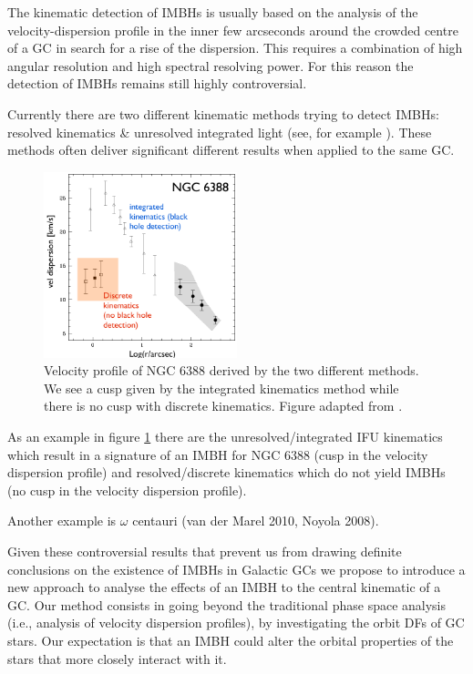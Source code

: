 \par The kinematic detection of \acp{IMBH} is usually based on the analysis of the velocity-dispersion profile in the inner few arcseconds around the crowded centre of a \ac{GC} in search for a rise of the dispersion. This requires a combination of high angular resolution and high spectral resolving power. For this reason the detection of \acp{IMBH} remains still highly controversial. 
\par Currently there are two different kinematic methods trying to detect \acp{IMBH}: resolved kinematics \& unresolved integrated light (see, for example \citealt{2015MNRAS.453..365B}). These methods often deliver significant different results when applied to the same \ac{GC}.
\begin{figure}[htbp]
\centering
\includegraphics[width=0.5\textwidth]{Plots/Paolo_talk_plot.png}
\caption{Velocity profile of NGC 6388 derived by the two different methods. We see a cusp given by the integrated kinematics method while there is no cusp with discrete kinematics. Figure adapted from \citet{2013ApJ...769..107L} .}
\label{fig:NGC6388}
\end{figure}
 As an example in figure \ref{fig:NGC6388} there are the unresolved/integrated IFU kinematics which result in a signature of an \ac{IMBH} for NGC 6388 (cusp in the velocity dispersion profile) \citep{2011A&A...533A..36L} and resolved/discrete kinematics which do not yield \acp{IMBH} (no cusp in the velocity dispersion profile)\citet{2013ApJ...769..107L}. 

Another example is \(\omega\) centauri (van der Marel 2010, Noyola 2008).

\par Given these controversial results that prevent us from drawing definite conclusions on the existence of \acp{IMBH} in Galactic \acp{GC} we propose to introduce a new approach to analyse the effects of an \ac{IMBH} to the central kinematic of a \ac{GC}. Our method consists in going beyond the traditional phase space analysis (i.e., analysis of velocity dispersion profiles), by investigating the orbit \acp{DF} of \ac{GC} stars. Our expectation is that an \ac{IMBH} could alter the orbital properties of the stars that more closely interact with it.
\\

